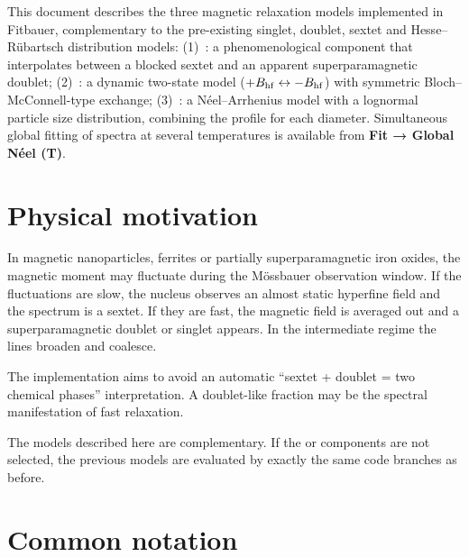 \noindent
This document describes the three magnetic relaxation models implemented in
Fitbauer, complementary to the pre-existing singlet, doublet, sextet and
Hesse--Rübartsch distribution models:
(1)~: a phenomenological component that interpolates between a
blocked sextet and an apparent superparamagnetic doublet;
(2)~: a dynamic two-state model ($+B_{\mathrm{hf}} \leftrightarrow -B_{\mathrm{hf}}$)
with symmetric Bloch--McConnell-type exchange;
(3)~: a Néel--Arrhenius model with a lognormal particle size
distribution, combining the  profile for each diameter.
Simultaneous global fitting of spectra at several temperatures is available from
\textbf{Fit → Global Néel (T)}.



\bigskip

\section{Physical motivation}

In magnetic nanoparticles, ferrites or partially superparamagnetic iron oxides,
the magnetic moment may fluctuate during the Mössbauer observation window. If the
fluctuations are slow, the nucleus observes an almost static hyperfine field and
the spectrum is a sextet. If they are fast, the magnetic field is averaged out and
a superparamagnetic doublet or singlet appears. In the intermediate regime the
lines broaden and coalesce.

The implementation aims to avoid an automatic ``sextet + doublet = two chemical
phases'' interpretation. A doublet-like fraction may be the spectral manifestation
of fast relaxation.

\begin{aviso}
The models described here are complementary. If the  or
 components are not selected, the previous models are evaluated by
exactly the same code branches as before.
\end{aviso}

\section{Common notation}

